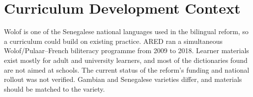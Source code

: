 \documentclass[12pt]{article}
\begin{document}
\section{Curriculum Development Context}
Wolof is one of the Senegalese national languages used in the bilingual reform, so a curriculum could build on existing practice. ARED ran a simultaneous Wolof/Pulaar--French biliteracy programme from 2009 to 2018. Learner materials exist mostly for adult and university learners, and most of the dictionaries found are not aimed at schools. The current status of the reform's funding and national rollout was not verified. Gambian and Senegalese varieties differ, and materials should be matched to the variety.
\end{document}
